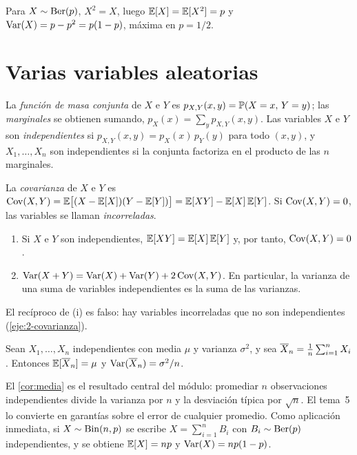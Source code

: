 \addtocounter{definicion}{1}%

Para $X\sim\operatorname{Ber}(p)$, $X^{2}=X$, luego $\mathbb{E}[X]=\mathbb{E}[X^{2}]=p$ y $\operatorname{Var}(X)=p-p^{2}=p(1-p)$, máxima en $p=1/2$.

\section{Varias variables aleatorias}

\begin{definicion}\label{def:conjunta}
La \emph{función de masa conjunta} de $X$ e $Y$ es $p_{X,Y}(x,y)=\mathbb{P}(X=x,\,Y=y)$; las \emph{marginales} se obtienen sumando, $p_X(x)=\sum_y p_{X,Y}(x,y)$. Las variables $X$ e $Y$ son \emph{independientes} si $p_{X,Y}(x,y)=p_X(x)\,p_Y(y)$ para todo $(x,y)$, y $X_1,\dots,X_n$ son independientes si la conjunta factoriza en el producto de las $n$ marginales.
\end{definicion}

\begin{definicion}[Covarianza]
La \emph{covarianza} de $X$ e $Y$ es $\operatorname{Cov}(X,Y)=\mathbb{E}\bigl[(X-\mathbb{E}[X])(Y-\mathbb{E}[Y])\bigr]=\mathbb{E}[XY]-\mathbb{E}[X]\,\mathbb{E}[Y]$. Si $\operatorname{Cov}(X,Y)=0$, las variables se llaman \emph{incorreladas}.
\end{definicion}

\begin{proposicion}\label{prop:suma}
\begin{enumerate}
  \item Si $X$ e $Y$ son independientes, $\mathbb{E}[XY]=\mathbb{E}[X]\,\mathbb{E}[Y]$ y, por tanto, $\operatorname{Cov}(X,Y)=0$.
  \item $\operatorname{Var}(X+Y)=\operatorname{Var}(X)+\operatorname{Var}(Y)+2\operatorname{Cov}(X,Y)$. En particular, la varianza de una suma de variables independientes es la suma de las varianzas.
\end{enumerate}
\end{proposicion}

El recíproco de (i) es falso: hay variables incorreladas que no son independientes (\cref{eje:2-covarianza}).

\begin{corolario}\label{cor:media}
Sean $X_1,\dots,X_n$ independientes con media $\mu$ y varianza $\sigma^{2}$, y sea $\overline{X}_n=\frac1n\sum_{i=1}^{n}X_i$. Entonces $\mathbb{E}[\overline{X}_n]=\mu$ y $\operatorname{Var}(\overline{X}_n)=\sigma^{2}/n$.
\end{corolario}

El \cref{cor:media} es el resultado central del módulo: promediar $n$ observaciones independientes divide la varianza por $n$ y la desviación típica por $\sqrt n$. El tema~5 lo convierte en garantías sobre el error de cualquier promedio. Como aplicación inmediata, si $X\sim\operatorname{Bin}(n,p)$ se escribe $X=\sum_{i=1}^{n}B_i$ con $B_i\sim\operatorname{Ber}(p)$ independientes, y se obtiene $\mathbb{E}[X]=np$ y $\operatorname{Var}(X)=np(1-p)$.

